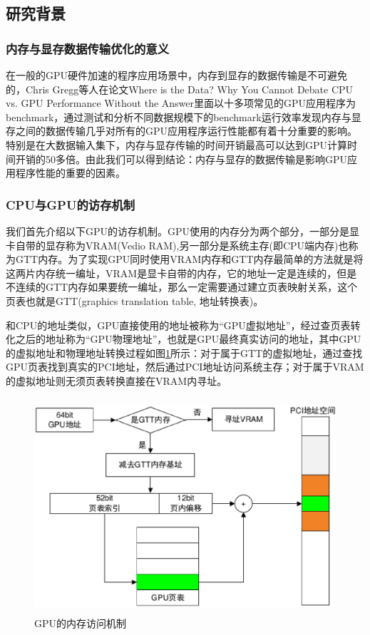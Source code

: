 
\subsection{研究背景}

\subsubsection{内存与显存数据传输优化的意义}

在一般的GPU硬件加速的程序应用场景中，内存到显存的数据传输是不可避免的，Chris Gregg等人在论文Where is the Data? Why You Cannot Debate CPU vs. GPU Performance Without the Answer\cite{Where-is-the-Data}里面以十多项常见的GPU应用程序为benchmark，通过测试和分析不同数据规模下的benchmark运行效率发现内存与显存之间的数据传输几乎对所有的GPU应用程序运行性能都有着十分重要的影响。特别是在大数据输入集下，内存与显存传输的时间开销最高可以达到GPU计算时间开销的50多倍。由此我们可以得到结论：内存与显存的数据传输是影响GPU应用程序性能的重要的因素。


\subsubsection{CPU与GPU的访存机制}

我们首先介绍以下GPU的访存机制。GPU使用的内存分为两个部分，一部分是显卡自带的显存称为VRAM(Vedio RAM),另一部分是系统主存(即CPU端内存)也称为GTT内存。为了实现GPU同时使用VRAM内存和GTT内存最简单的方法就是将这两片内存统一编址，VRAM是显卡自带的内存，它的地址一定是连续的，但是不连续的GTT内存如果要统一编址，那么一定需要通过建立页表映射关系，这个页表也就是GTT(graphics translation table, 地址转换表)。

和CPU的地址类似，GPU直接使用的地址被称为“GPU虚拟地址”，经过查页表转化之后的地址称为“GPU物理地址”，也就是GPU最终真实访问的地址，其中GPU的虚拟地址和物理地址转换过程如图\ref{fig:gpu-mmu}所示：对于属于GTT的虚拟地址，通过查找GPU页表找到真实的PCI地址，然后通过PCI地址访问系统主存；对于属于VRAM的虚拟地址则无须页表转换直接在VRAM内寻址。

\begin{figure}[H] 
  \centering
  \includegraphics[width=12cm,height=8cm]{figures/chap03/gpu-mmu}
  \caption{GPU的内存访问机制}
  \label{fig:gpu-mmu}
\end{figure}

